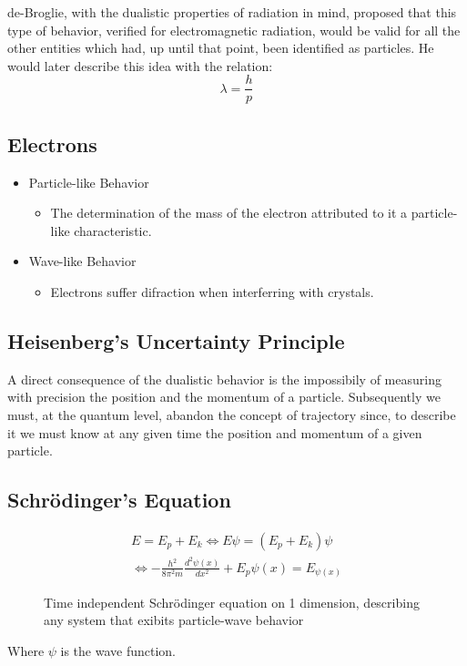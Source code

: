 \documentclass{article}[10pt]
\begin{document}
de-Broglie, with the dualistic properties of radiation in mind,
proposed that this type of behavior, verified for electromagnetic radiation,
would be valid for all the other entities which had, up until that point, been
identified as particles. He would later describe this idea with the
relation:
$$\lambda = \frac{h}{p}$$
\subsection{Electrons}
\begin{itemize}
	\item Particle-like Behavior
	      \begin{itemize}
	      	\item The determination of the mass of the electron attributed to
	      	      it a particle-like characteristic.
	      \end{itemize}
	\item Wave-like Behavior
	      \begin{itemize}
	      	\item Electrons suffer difraction when interferring with crystals.
	      \end{itemize}
\end{itemize}
\subsection{Heisenberg's Uncertainty Principle}
A direct consequence of the dualistic behavior is the impossibily of measuring
with precision the position and the momentum of a particle. Subsequently we
must, at the quantum level, abandon the concept of trajectory since, to describe
it we must know at any given time the position and momentum of a given particle.
\subsection{Schrödinger's Equation}
\begin{figure}[H]
	\centering
	\begin{align*}
		E = E_p + E_k \iff E\psi = (E_p + E_k)\psi                                   \\
		\iff -\frac{h^2}{8\pi^2 m}\frac{d^2\psi(x)}{dx^2} + E_p\psi(x) = E_{\psi(x)}
	\end{align*}
	\caption*{Time independent Schrödinger equation on 1 dimension, describing any system that exibits particle-wave behavior}
\end{figure}

Where $\psi$ is the wave function.
\end{document}
